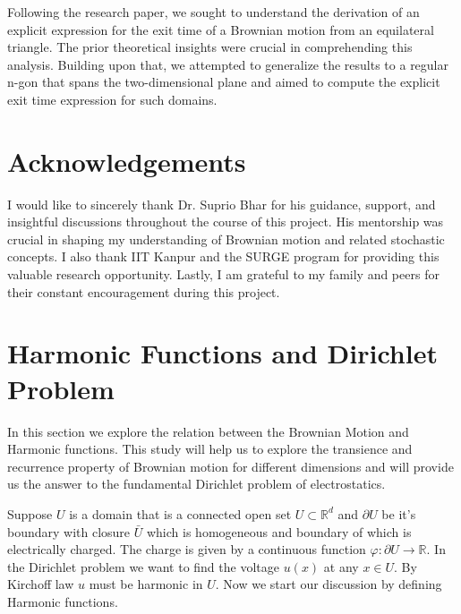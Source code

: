 \documentclass[11pt, a4paper, oneside]{report}
\numberwithin{equation}{section}
\begin{document}
\noindent Following the research paper, we sought to understand the derivation of an explicit expression for the exit time of a Brownian motion from an equilateral triangle. The prior theoretical insights were crucial in comprehending this analysis. Building upon that, we attempted to generalize the results to a regular n-gon that spans the two-dimensional plane and aimed to compute the explicit exit time expression for such domains.

\chapter*{Acknowledgements}

I would like to sincerely thank Dr. Suprio Bhar for his guidance, support, and insightful discussions throughout the course of this project. His mentorship was crucial in shaping my understanding of Brownian motion and related stochastic concepts.
\noindent I also thank IIT Kanpur and the SURGE program for providing this valuable research opportunity. Lastly, I am grateful to my family and peers for their constant encouragement during this project.



\tableofcontents

\chapter{Harmonic Functions and Dirichlet Problem }
In this section we explore the relation between the Brownian Motion and Harmonic functions. This study will help us to explore the transience and recurrence property of Brownian motion for different dimensions and will provide us the answer to the fundamental Dirichlet problem of electrostatics. 

\noindent Suppose \(U \) is a domain that is a connected open set \(U \subset \mathbb{R}^d\) and \(\partial{U}\) be it's boundary with closure \(\bar{U}\) which is homogeneous and boundary of which is electrically charged. The charge is given by a continuous function \(\varphi : \partial{U} \to \mathbb{R}\). In the Dirichlet problem we want to find the voltage \(u(x)\) at any \(x \in U\). By Kirchoff law \(u\) must be harmonic in \(U\). Now we start our discussion by defining Harmonic functions.
\end{document}
